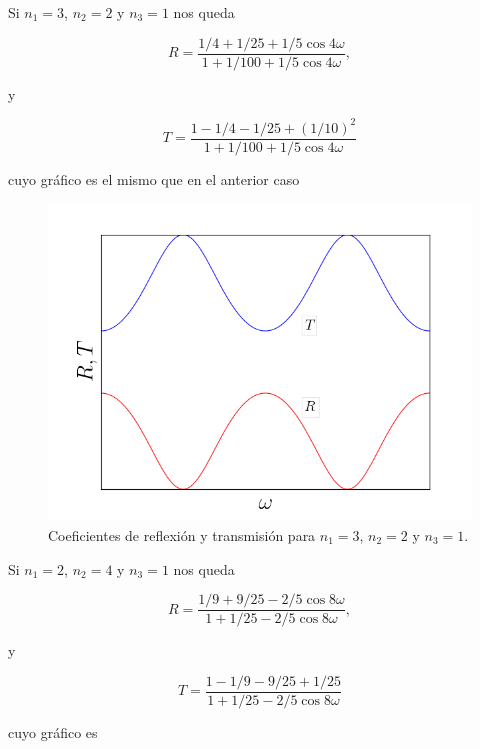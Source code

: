 \documentclass[a4paper,11pt]{article}
\numberwithin{equation}{section}
\begin{document}
Si $n_1 = 3$, $n_2 =2$ y $n_3 = 1$ nos queda

\begin{equation}
 R = \frac{1/4 + 1/25 + 1/5\cos{4\omega}}{1 + 1/100 + 1/5\cos{4\omega}},
\end{equation}

y 

\begin{equation}
 T = \frac{1 - 1/4 - 1/25 + (1/10)^2}{1 + 1/100 + 1/5\cos{4\omega}}
\end{equation}

cuyo gráfico es el mismo que en el anterior caso 

\begin{figure}[H]
 \center 
 \includegraphics[scale=0.5]{problema1fig2}
 \caption{Coeficientes de reflexión y transmisión para $n_1 = 3$, $n_2 = 2$ y $n_3 = 1$.}
\end{figure}

Si $n_1 = 2$, $n_2 =4$ y $n_3 = 1$ nos queda

\begin{equation}
 R = \frac{1/9 + 9/25 - 2/5\cos{8\omega}}{1 + 1/25 - 2/5\cos{8\omega}},
\end{equation}

y 

\begin{equation}
 T = \frac{1 - 1/9 - 9/25 + 1/25}{1 + 1/25 - 2/5\cos{8\omega}}
\end{equation}

cuyo gráfico es 
\end{document}
